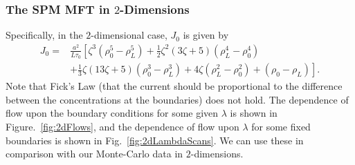 \subsubsection{The SPM MFT in $2$-Dimensions}
Specifically, in the $2$-dimensional case, $J_0$ is given by
\begin{equation}
\begin{aligned}
 J_0 = &\frac{a^2}{L \tau_0} \left[ \zeta^3\left(\rho_0^5 - \rho_L^5\right) +\frac{1}{2} \zeta^2 \left(3 \zeta+5\right)
 \left(\rho_L^4  - \rho_0^4 \right) \right. \\  
  &+ \left.\frac{1}{3}\zeta\left(13 \zeta+5\right)\left( \rho_0^3 -\rho_L^3 \right)+ 4 \zeta \left( \rho_L^2
 -\rho_0^2 \right)+\left(\rho_0 - \rho_L\right) \right].
\end{aligned}
\end{equation}
Note that Fick's Law (that the current should be proportional to the difference between the concentrations at
the boundaries) does not hold.
The dependence of flow upon the boundary conditions for some given $\lambda$ is shown in
Figure.~\ref{fig:2dFlows}, and the dependence of flow upon $\lambda$ for some fixed boundaries is shown in Fig.~\ref{fig:2dLambdaScans}. We can use these in comparison with our Monte-Carlo data in
$2$-dimensions.
